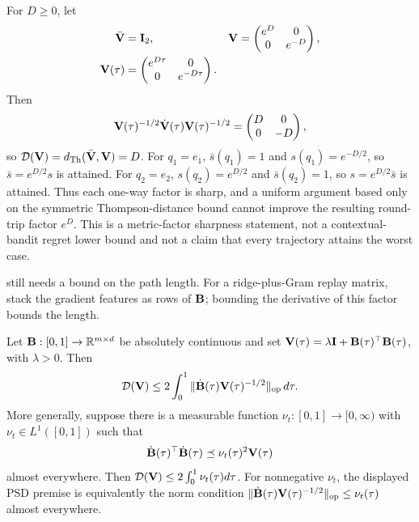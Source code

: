 \begin{remark}
For $D\ge0$, let
\[
\begin{aligned}
 \bar{\mathbf{V}}&=\mathbf{I}_2,&
 \mathbf{V}&=\begin{pmatrix}e^D&0\\0&e^{-D}\end{pmatrix},\\
 \mathbf{V}(\tau)&=\begin{pmatrix}e^{D\tau}&0\\0&e^{-D\tau}\end{pmatrix}.
\end{aligned}
\]
Then
\[
 \mathbf{V}(\tau)^{-1/2}\dot{\mathbf{V}}(\tau)\mathbf{V}(\tau)^{-1/2}
 =\begin{pmatrix}D&0\\0&-D\end{pmatrix},
\]
so $\mathcal D(\mathbf{V})=d_{\rm Th}(\bar{\mathbf{V}},\mathbf{V})=D$.  For $q_1=e_1$,
$\bar s(q_1)=1$ and $s(q_1)=e^{-D/2}$, so
$\bar s=e^{D/2}s$ is attained.  For $q_2=e_2$,
$s(q_2)=e^{D/2}$ and $\bar s(q_2)=1$, so
$s=e^{D/2}\bar s$ is attained.  Thus each one-way factor is sharp, and a
uniform argument based only on the symmetric Thompson-distance bound cannot
improve the resulting round-trip factor $e^D$.  This is a metric-factor
sharpness statement, not a contextual-bandit regret lower bound and not a
claim that every trajectory attains the worst case.
\end{remark}

 still needs a bound on the path length. For a
ridge-plus-Gram replay matrix, stack the gradient features as rows of $\mathbf{B}$;
bounding the derivative of this factor bounds the length.

\begin{lemma}
\label{lem:factor-spd-path}
Let $\mathbf{B}:[0,1]\to\mathbb{R}^{m\times d}$ be absolutely continuous and set
$\mathbf{V}(\tau)=\lambda\mathbf{I}+\mathbf{B}(\tau)^\top\mathbf{B}(\tau)$, with $\lambda>0$.
Then
\begin{equation}\label{eq:factor-path-bound-new}
 \mathcal D(\mathbf{V})\le2\int_0^1
 \|\dot{\mathbf{B}}(\tau)\mathbf{V}(\tau)^{-1/2}\|_{\rm op}\,d\tau.
\end{equation}
More generally, suppose there is a measurable function
$\nu_t:[0,1]\to[0,\infty)$ with $\nu_t\in L^1([0,1])$ such that
\[
 \dot{\mathbf{B}}(\tau)^\top\dot{\mathbf{B}}(\tau)
 \preceq\nu_t(\tau)^2\mathbf{V}(\tau)
\]
almost everywhere.  Then
$\mathcal D(\mathbf{V})\le2\int_0^1\nu_t(\tau)d\tau$.  For nonnegative $\nu_t$, the
displayed PSD premise is equivalently the norm condition
$\|\dot{\mathbf{B}}(\tau)\mathbf{V}(\tau)^{-1/2}\|_{\rm op}\le\nu_t(\tau)$ almost everywhere.
\end{lemma}

